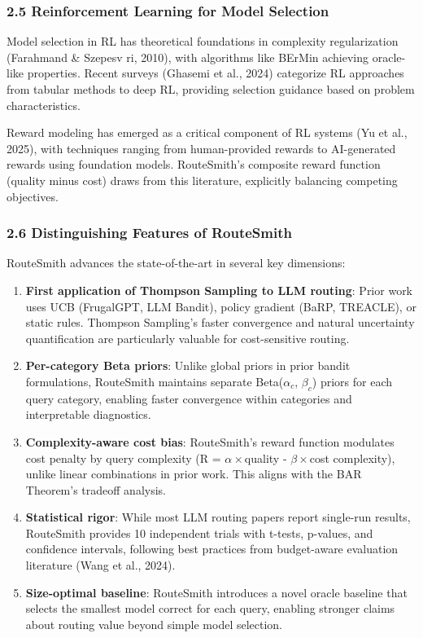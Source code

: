 \hypertarget{reinforcement-learning-for-model-selection}{%
\subsubsection{2.5 Reinforcement Learning for Model
Selection}\label{reinforcement-learning-for-model-selection}}

Model selection in RL has theoretical foundations in complexity
regularization (Farahmand \& Szepesv ri, 2010), with algorithms like
BErMin achieving oracle-like properties. Recent surveys (Ghasemi et al.,
2024) categorize RL approaches from tabular methods to deep RL,
providing selection guidance based on problem characteristics.

Reward modeling has emerged as a critical component of RL systems (Yu et
al., 2025), with techniques ranging from human-provided rewards to
AI-generated rewards using foundation models. RouteSmith's composite
reward function (quality minus cost) draws from this literature,
explicitly balancing competing objectives.

\hypertarget{distinguishing-features-of-routesmith}{%
\subsubsection{2.6 Distinguishing Features of
RouteSmith}\label{distinguishing-features-of-routesmith}}

RouteSmith advances the state-of-the-art in several key dimensions:

\begin{enumerate}
\def\labelenumi{\arabic{enumi}.}
\item
  \textbf{First application of Thompson Sampling to LLM routing}: Prior
  work uses UCB (FrugalGPT, LLM Bandit), policy gradient (BaRP,
  TREACLE), or static rules. Thompson Sampling's faster convergence and
  natural uncertainty quantification are particularly valuable for
  cost-sensitive routing.
\item
  \textbf{Per-category Beta priors}: Unlike global priors in prior
  bandit formulations, RouteSmith maintains separate Beta(\(\alpha_c\),
  \(\beta_c\)) priors for each query category, enabling faster
  convergence within categories and interpretable diagnostics.
\item
  \textbf{Complexity-aware cost bias}: RouteSmith's reward function
  modulates cost penalty by query complexity (R =
  \(\alpha\times\)quality - \(\beta\times\)cost complexity), unlike
  linear combinations in prior work. This aligns with the BAR Theorem's
  tradeoff analysis.
\item
  \textbf{Statistical rigor}: While most LLM routing papers report
  single-run results, RouteSmith provides 10 independent trials with
  t-tests, p-values, and confidence intervals, following best practices
  from budget-aware evaluation literature (Wang et al., 2024).
\item
  \textbf{Size-optimal baseline}: RouteSmith introduces a novel oracle
  baseline that selects the smallest model correct for each query,
  enabling stronger claims about routing value beyond simple model
  selection.
\end{enumerate}

